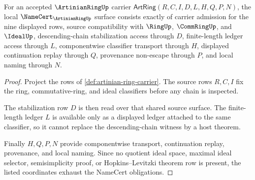 \begin{theorem}\label{thm:artinian-ring-namecert-obligations}
For an accepted $\ArtinianRingUp$ carrier $\mathsf{ArtRing}(R,C,I,D,L,H,Q,P,N)$, the local $\NameCert_{\ArtinianRingUp}$ surface consists exactly of carrier admission for the nine displayed rows, source compatibility with $\RingUp$, $\CommRingUp$, and $\IdealUp$, descending-chain stabilization access through $D$, finite-length ledger access through $L$, componentwise classifier transport through $H$, displayed continuation replay through $Q$, provenance non-escape through $P$, and local naming through $N$.
\end{theorem}
\begin{proof}
Project the rows of \autoref{def:artinian-ring-carrier}. The source rows $R,C,I$ fix the ring, commutative-ring, and ideal classifiers before any chain is inspected.

The stabilization row $D$ is then read over that shared source surface. The finite-length ledger $L$ is available only as a displayed ledger attached to the same classifier, so it cannot replace the descending-chain witness by a host theorem.

Finally $H,Q,P,N$ provide componentwise transport, continuation replay, provenance, and local naming. Since no quotient ideal space, maximal ideal selector, semisimplicity proof, or Hopkins--Levitzki theorem row is present, the listed coordinates exhaust the NameCert obligations.
\end{proof}

